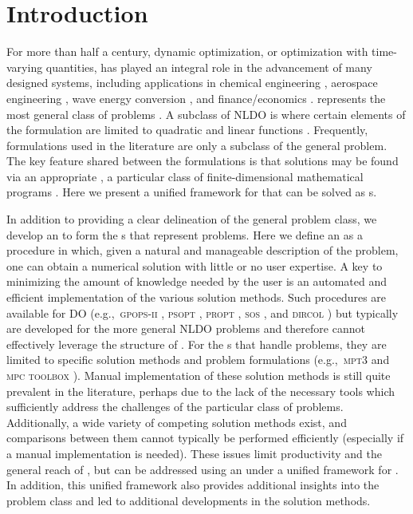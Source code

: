 \section{Introduction}

For more than half a century, dynamic optimization, or optimization with time-varying quantities, has played an integral role in the advancement of many designed systems, including applications in chemical engineering \cite{Biegler2010a}, aerospace engineering \cite{Betts2010a}, wave energy conversion \cite{Faedo2017a}, and finance/economics \cite{Deissenberg2005a}.
 represents the most general class of problems \cite{Betts2010a, Biegler2010a, Bryson1975a}.
A subclass of NLDO is  where certain elements of the formulation are limited to quadratic and linear functions \cite{Bryson1975a, Anderson2007a, Liberzon2012a}. 
Frequently, \lqdo{} formulations used in the literature are only a subclass of the general \lqdo{} problem.
The key feature shared between the \lqdo{} formulations is that solutions may be found via an appropriate , a particular class of finite-dimensional mathematical programs \cite{Boyd2009a}.
Here we present a unified framework for \lqdo{} that can be solved as {\qp}s.

In addition to providing a clear delineation of the general \lqdo{} problem class, we develop an  to form the {\qp}s that represent \lqdo{} problems.
Here we define an \apgp{} as a procedure in which, given a natural and manageable description of the problem, one can obtain a numerical solution with little or no user expertise.
A key to minimizing the amount of knowledge needed by the user is an automated and efficient implementation of the various solution methods.
Such procedures are available for DO (e.g.,~\textsc{gpops-ii} \cite{Patterson2014a}, \textsc{psopt} \cite{Becerra2015a}, \textsc{propt} \cite{Rutquist2010a}, \textsc{sos} \cite{SOS2015a}, and \textsc{dircol} \cite{Stryk1999a}) but typically are developed for the more general NLDO problems and therefore cannot effectively leverage the structure of \lqdo.
For the {\apgp}s that handle \lqdo{} problems, they are limited to specific solution methods and problem formulations (e.g.,~\textsc{mpt3} \cite{Herceg2013a} and \textsc{mpc toolbox} \cite{matlab-mpc}).
Manual implementation of these solution methods is still quite prevalent in the literature, perhaps due to the lack of the necessary tools which sufficiently address the challenges of the particular class of problems.
Additionally, a wide variety of competing solution methods exist, and comparisons between them cannot typically be performed efficiently (especially if a manual implementation is needed).
These issues limit productivity and the general reach of \lqdo, but can be addressed using an \apgp{} under a unified framework for \lqdo. 
In addition, this unified framework also provides additional insights into the \lqdo{} problem class and led to additional developments in the solution methods. 

